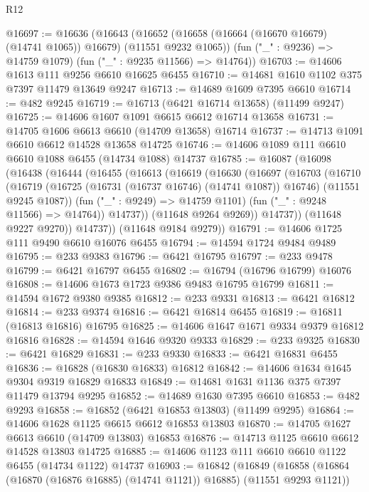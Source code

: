 \begin{lexlean}{R12}
\begin{coremodule}
{{{{{{{{{{{{{{{{{{{{{{{{{{{{{{{{{{{{{{{{{{{{{{{{{{{{{{{{{{{{{{{{{{{{{{{{{{{{{{{{{{@16697 := @16636
    (@16643
      (@16652 (@16658 (@16664 (@16670 @16679) (@14741 @1065)) @16679) (@11551 @9232 @1065))
      (fun ("_" : @9236) => @14759 @1079)
      (fun ("_" : @9235 @11566) => @14764))
@16703 := @14606 @1613 @111 @9256 @6610 @16625 @6455
@16710 := @14681 @1610 @1102 @375 @7397 @11479 @13649 @9247
@16713 := @14689 @1609 @7395 @6610
@16714 := @482 @9245
@16719 := @16713 (@6421 @16714 @13658) (@11499 @9247)
@16725 := @14606 @1607 @1091 @6615 @6612 @16714 @13658
@16731 := @14705 @1606 @6613 @6610 (@14709 @13658) @16714
@16737 := @14713 @1091 @6610 @6612 @14528 @13658 @14725
@16746 := @14606 @1089 @111 @6610 @6610 @1088 @6455 (@14734 @1088) @14737
@16785 := @16087
    (@16098
      (@16438
        (@16444
          (@16455
            (@16613
              (@16619
                (@16630
                  (@16697
                    (@16703
                      (@16710
                        (@16719
                          (@16725 (@16731 (@16737 @16746) (@14741 @1087)) @16746)
                          (@11551 @9245 @1087))
                        (fun ("_" : @9249) => @14759 @1101)
                        (fun ("_" : @9248 @11566) => @14764))
                      @14737))
                  (@11648 @9264 @9269))
                @14737))
            (@11648 @9227 @9270))
          @14737))
      (@11648 @9184 @9279))
@16791 := @14606 @1725 @111 @9490 @6610 @16076 @6455
@16794 := @14594 @1724 @9484 @9489
@16795 := @233 @9383
@16796 := @6421 @16795
@16797 := @233 @9478
@16799 := @6421 @16797 @6455
@16802 := @16794 (@16796 @16799) @16076
@16808 := @14606 @1673 @1723 @9386 @9483 @16795 @16799
@16811 := @14594 @1672 @9380 @9385
@16812 := @233 @9331
@16813 := @6421 @16812
@16814 := @233 @9374
@16816 := @6421 @16814 @6455
@16819 := @16811 (@16813 @16816) @16795
@16825 := @14606 @1647 @1671 @9334 @9379 @16812 @16816
@16828 := @14594 @1646 @9320 @9333
@16829 := @233 @9325
@16830 := @6421 @16829
@16831 := @233 @9330
@16833 := @6421 @16831 @6455
@16836 := @16828 (@16830 @16833) @16812
@16842 := @14606 @1634 @1645 @9304 @9319 @16829 @16833
@16849 := @14681 @1631 @1136 @375 @7397 @11479 @13794 @9295
@16852 := @14689 @1630 @7395 @6610
@16853 := @482 @9293
@16858 := @16852 (@6421 @16853 @13803) (@11499 @9295)
@16864 := @14606 @1628 @1125 @6615 @6612 @16853 @13803
@16870 := @14705 @1627 @6613 @6610 (@14709 @13803) @16853
@16876 := @14713 @1125 @6610 @6612 @14528 @13803 @14725
@16885 := @14606 @1123 @111 @6610 @6610 @1122 @6455 (@14734 @1122) @14737
@16903 := @16842
    (@16849
      (@16858 (@16864 (@16870 (@16876 @16885) (@14741 @1121)) @16885) (@11551 @9293 @1121))
}}}}}}}}}}}}}}}}}}}}}}}}}}}}}}}}}}}}}}}}}}}}}}}}}}}}}}}}}}}}}}}}}}}}}}}}}}}}}}}}}}
\end{coremodule}
\end{lexlean}
